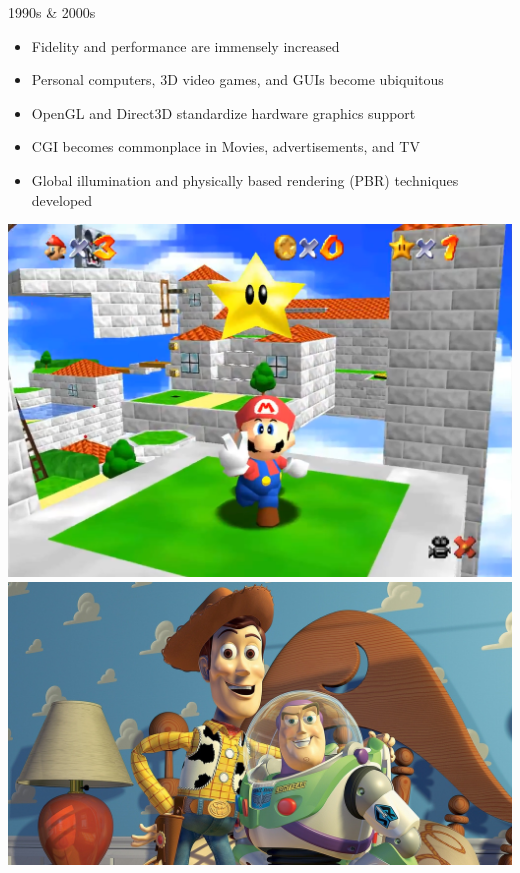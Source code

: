\documentclass{lug}
\begin{document}
\begin{frame}{1990s \& 2000s}
    \noindent
    \begin{minipage}{.65\textwidth - 2em}
        \small
        \begin{itemize}
            \item Fidelity and performance are immensely increased
            \item Personal computers, 3D video games, and GUIs become ubiquitous
            \item OpenGL and Direct3D standardize hardware graphics support
            \item CGI becomes commonplace in Movies, advertisements, and TV 
            \item Global illumination and physically based rendering (PBR) techniques developed
        \end{itemize}
    \end{minipage}%
    \hspace{1.5em}%
    \begin{minipage}{.35\textwidth}
        \includegraphics[width=\textwidth]{graphics/supermario64} \\
        \includegraphics[width=\textwidth]{graphics/toy_story} \\

\end{minipage}
\end{frame}
\end{document}
